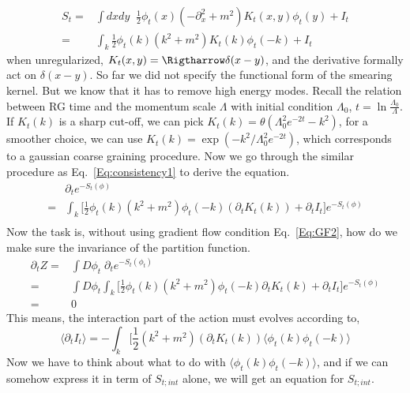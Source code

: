 \documentclass[a4paper,11pt]{article}
\begin{document}
\begin{equation}
\begin{split}
S_t=& \int dxdy \;\; \frac{1}{2}\phi_t(x) (-\partial_x^2 +m^2 )K_t(x,y) \phi_t(y)  + I_{t} \\
      =& \int_k \frac{1}{2}\phi_t(k) (k^2 +m^2)K_t(k)\phi_t(-k) + I_{t} 
\end{split}
\end{equation}
when unregularized, $K_t(x,y) =\Rigtharrow \delta(x-y)$, and the derivative formally act on $\delta(x-y)$. So far we did not specify the functional form of the smearing kernel. But we know that it has to remove high energy modes. Recall the relation between RG time and the momentum scale $\Lambda$ with initial condition $\Lambda_0$, $t=\ln \frac{\Lambda_0}{\Lambda}$. If $K_t(k)$ is a sharp cut-off, we can pick $K_t(k)=\theta(\Lambda^2_0e^{-2t}-k^2)$, for a smoother choice, we can use $K_t(k)=\exp(-k^2/\Lambda^2_0e^{-2t})$, which corresponds to a gaussian coarse graining procedure. Now we go through the similar procedure as Eq.~\eqref{Eq:consistency1} to derive the equation.
\begin{equation}
\begin{split}
&\partial_t e^{-S_t(\phi)}\\
=&\int_k \Big[\frac{1}{2}\phi_t(k) (k^2 +m^2)\phi_t(-k) (\partial_t K_t(k))+ \partial_t I_{t}  \Big]e^{-S_t(\phi)}
 \\
\label{Eq:consistency2}
\end{split}
\end{equation}
Now the task is, without using gradient flow condition Eq.~\ref{Eq:GF2}, how do we make sure the invariance of the partition function. 
\begin{equation}
\begin{split}
\partial_t Z 
=& \int D\phi_t  \;\partial_t e^{-S_t(\phi_t)} \\
=& \int D\phi_t \int_k \Big[\frac{1}{2}\phi_t(k) (k^2 +m^2)\phi_t(-k) \partial_t K_t(k)+ \partial_t I_{t}  \Big]e^{-S_t(\phi)}\\
=& 0
\end{split}
\end{equation}
This means, the interaction part of the action must evolves according to,
\begin{equation}
\langle \partial_t I_{t} \rangle=-\int_k \Big[\frac{1}{2} (k^2 +m^2)(\partial_t K_t(k)) \langle \phi_t(k) \phi_t(-k)  \rangle
\end{equation}
Now we have to think about what to do with $\langle \phi_t(k) \phi_t(-k)  \rangle$, and if we can somehow express it in term of $S_{t; int}$ alone, we will get an equation for $S_{t; int}$. 
\end{document}
